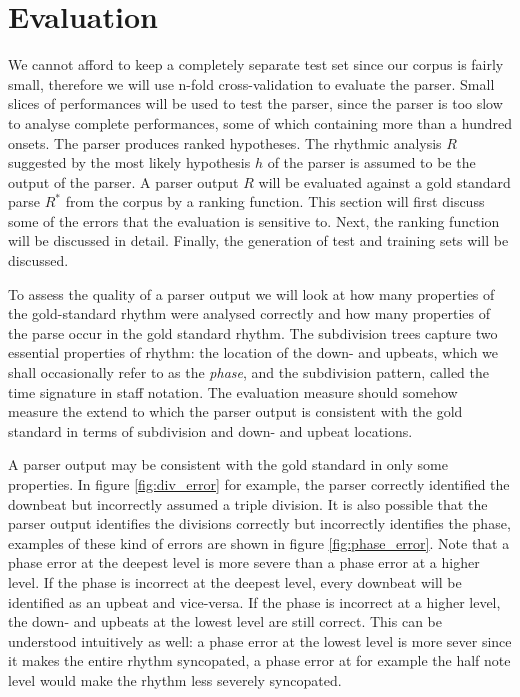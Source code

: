 \chapter{Evaluation}
\label{sec:evaluation}




We cannot afford to keep a completely separate test set since our corpus is fairly small, therefore we will use n-fold cross-validation to evaluate the parser. Small slices of performances will be used to test the parser, since the parser is too slow to analyse complete performances, some of which containing more than a hundred onsets.  The parser produces ranked hypotheses. The rhythmic analysis $R$ suggested by the most likely hypothesis $h$ of the parser is assumed to be the output of the parser. A parser output $R$ will be evaluated against a gold standard parse $R^*$ from the corpus by a ranking function. This section will first discuss some of the errors that the evaluation is sensitive to. Next, the ranking function will be discussed in detail. Finally, the generation of test and training sets will be discussed.

To assess the quality of a parser output we will look at how many properties of the gold-standard rhythm were analysed correctly and how many properties of the parse occur in the gold standard rhythm. The subdivision trees capture two essential properties of rhythm: the location of the down- and upbeats, which we shall occasionally refer to as the \textit{phase}, and the subdivision pattern, called the time signature in staff notation. The evaluation measure should somehow measure the extend to which the parser output is consistent with the gold standard in terms of subdivision and down- and upbeat locations. 

A parser output may be consistent with the gold standard in only some properties. In figure \ref{fig:div_error} for example, the parser correctly identified the downbeat but incorrectly assumed a triple division. It is also possible that the parser output identifies the divisions correctly but incorrectly identifies the phase, examples of these kind of errors are shown in figure \ref{fig:phase_error}. Note that a phase error at the deepest level is more severe than a phase error at a higher level. If the phase is incorrect at the deepest level, every downbeat will be identified as an upbeat and vice-versa. If the phase is incorrect at a higher level, the down- and upbeats at the lowest level are still correct. This can be understood intuitively as well: a phase error at the lowest level is more sever since it makes the entire rhythm syncopated, a phase error at for example the half note level would make the rhythm less severely syncopated.

